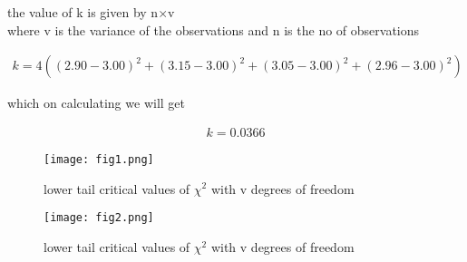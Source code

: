 \documentclass[journal,12pt,twocolumn]{IEEEtran}
\providecommand{\brak}[1]{\ensuremath{\left(#1\right)}}
\begin{document}
\begin{frame}{}
    \begin{block}{}
       the value of k is given by n$\times$v \\
       where v is the variance of the observations and n is the no of observations
       
       \begin{align*}
           k= 4\brak{ (2.90 - 3.00)^{2} + (3.15 - 3.00)^{2} + (3.05 - 3.00)^{2} + (2.96 - 3.00)^{2} }
       \end{align*}
       
       which on calculating we will get 
       
       \begin{align}
           k = 0.0366
       \end{align}
       
    \end{block}
\end{frame}



\begin{frame}

     \begin{figure}
           \centering
           \texttt{[image: fig1.png]}
           \caption{ lower tail critical values of ${\chi}^{2}$ with v degrees of freedom }
          \label{fig:my_ label1}
      \end{figure}
      
\end{frame}



\begin{frame}

     \begin{figure}
           \centering
           \texttt{[image: fig2.png]}
           \caption{{ lower tail critical values of ${\chi}^{2}$ with v degrees of freedom }}
           \label{fig:my_label2}
      \end{figure}
      
\end{frame}
\end{document}
